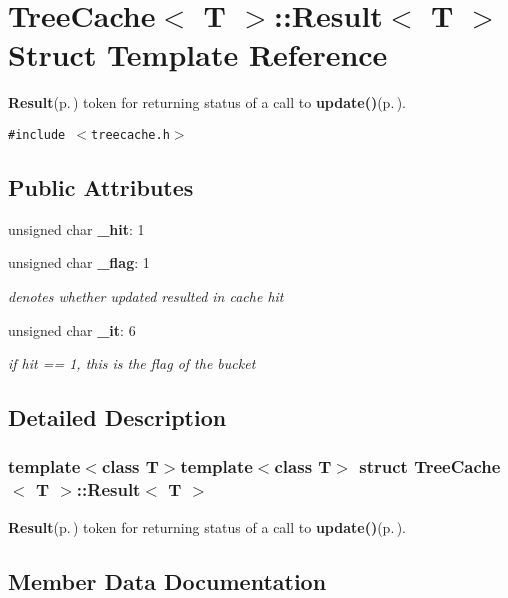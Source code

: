 \section{Tree\-Cache$<$ T $>$::Result$<$ T $>$ Struct Template Reference}
\label{structTreeCache_1_1Result}
{\bf Result}{\rm (p.\,\pageref{structTreeCache_1_1Result})} token for returning status of a call to {\bf update()}{\rm (p.\,\pageref{classTreeCache_a4})}.  


{\tt \#include $<$treecache.h$>$}

\subsection*{Public Attributes}
\begin{CompactItemize}
\item 
unsigned char {\bf \_\-hit}: 1
\item 
unsigned char {\bf \_\-flag}: 1
\begin{CompactList}\small\item\em denotes whether updated resulted in cache hit \item\end{CompactList}\item 
unsigned char {\bf \_\-it}: 6
\begin{CompactList}\small\item\em if hit == 1, this is the flag of the bucket \item\end{CompactList}\end{CompactItemize}


\subsection{Detailed Description}
\subsubsection*{template$<$class T$>$template$<$class T$>$ struct Tree\-Cache$<$ T $>$::Result$<$ T $>$}

{\bf Result}{\rm (p.\,\pageref{structTreeCache_1_1Result})} token for returning status of a call to {\bf update()}{\rm (p.\,\pageref{classTreeCache_a4})}. 



\subsection{Member Data Documentation}
